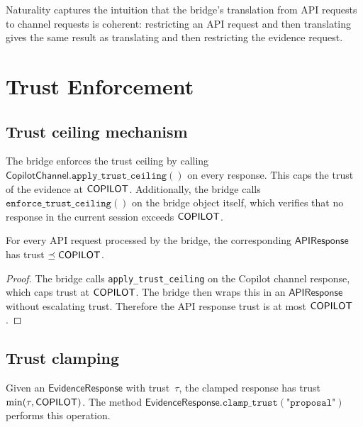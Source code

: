 \documentclass[11pt]{article}
\newcommand{\APIResp}{\mathsf{APIResponse}}
\newcommand{\CopChan}{\mathsf{CopilotChannel}}
\newcommand{\EvResp}{\mathsf{EvidenceResponse}}
\begin{document}
\begin{remark}
Naturality captures the intuition that the bridge's
translation from API requests to channel requests is
coherent: restricting an API request and then translating
gives the same result as translating and then restricting
the evidence request.
\end{remark}

\section{Trust Enforcement}\label{sec:trustenforce}

\subsection{Trust ceiling mechanism}

\begin{definition}\label{def:trustenforce}
The bridge enforces the trust ceiling by calling
$\CopChan.\texttt{apply\_trust\_ceiling}()$ on every
response.  This caps the trust of the evidence at
$\mathsf{COPILOT}$.  Additionally, the bridge calls
$\texttt{enforce\_trust\_ceiling}()$ on the bridge
object itself, which verifies that no response in
the current session exceeds $\mathsf{COPILOT}$.
\end{definition}

\begin{lemma}\label{lem:bridgeceil}
For every API request processed by the bridge, the
corresponding $\APIResp$ has trust $\preceq \mathsf{COPILOT}$.
\end{lemma}
\begin{proof}
The bridge calls \texttt{apply\_trust\_ceiling} on the
Copilot channel response, which caps trust at $\mathsf{COPILOT}$.
The bridge then wraps this in an $\APIResp$ without
escalating trust.  Therefore the API response trust is
at most $\mathsf{COPILOT}$.
\end{proof}

\subsection{Trust clamping}

\begin{definition}\label{def:trustclamp}
Given an $\EvResp$ with trust~$\tau$, the clamped response
has trust $\min(\tau, \mathsf{COPILOT})$.  The method
$\EvResp.\texttt{clamp\_trust}(\texttt{"proposal"})$
performs this operation.
\end{definition}
\end{document}
